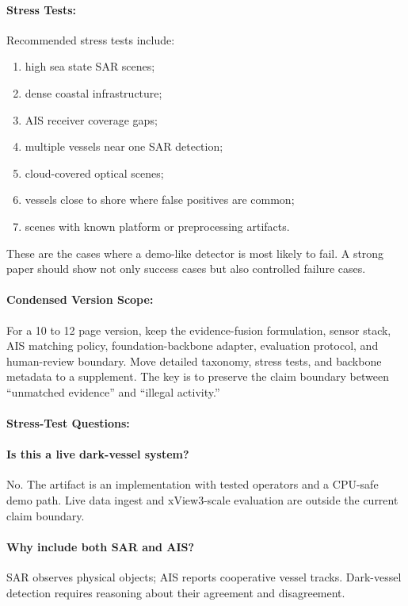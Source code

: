 \documentclass{article}
\begin{document}
\paragraph{Stress Tests:}

Recommended stress tests include:
\begin{enumerate}
  \item high sea state SAR scenes;
  \item dense coastal infrastructure;
  \item AIS receiver coverage gaps;
  \item multiple vessels near one SAR detection;
  \item cloud-covered optical scenes;
  \item vessels close to shore where false positives are common;
  \item scenes with known platform or preprocessing artifacts.
\end{enumerate}
These are the cases where a demo-like detector is most likely to fail. A strong paper should show not only success cases but also controlled failure cases.

\paragraph{Condensed Version Scope:}

For a 10 to 12 page version, keep the evidence-fusion formulation, sensor stack, AIS matching policy, foundation-backbone adapter, evaluation protocol, and human-review boundary. Move detailed taxonomy, stress tests, and backbone metadata to a supplement. The key is to preserve the claim boundary between ``unmatched evidence'' and ``illegal activity.''

\paragraph{Stress-Test Questions:}

\paragraph{Is this a live dark-vessel system?}
No. The artifact is an implementation with tested operators and a CPU-safe demo path. Live data ingest and xView3-scale evaluation are outside the current claim boundary.

\paragraph{Why include both SAR and AIS?}
SAR observes physical objects; AIS reports cooperative vessel tracks. Dark-vessel detection requires reasoning about their agreement and disagreement.
\end{document}
